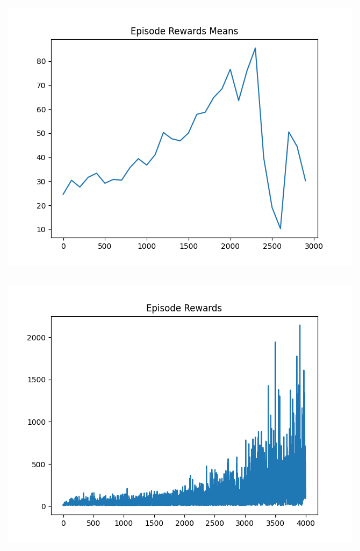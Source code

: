 \begin{figure}[H]
    \centering
    \begin{subfigure}{.47\linewidth}
        \centering
        \includegraphics[width=\textwidth]{pole/2024-06-13_18-50-05_dqn_cartpole_episode_rewards_means.png}
    \end{subfigure}
    \begin{subfigure}{.47\linewidth}
        \centering
        \includegraphics[width=\textwidth]{pole/2024-06-14_16-42-26_dqn_cartpole_episode_rewards.png}
    \end{subfigure}
    \begin{subfigure}{.47\linewidth}
        \centering

\end{subfigure}
\end{figure}
